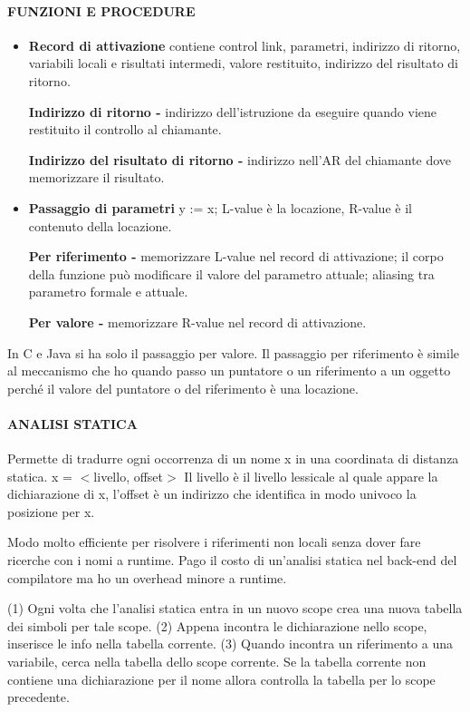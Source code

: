 \documentclass[a4paper, 12pt]{article}
\begin{document}
\paragraph{FUNZIONI E PROCEDURE}
\begin{itemize}
    \item \textbf{Record di attivazione} contiene control link, parametri, indirizzo di
    ritorno, variabili locali e risultati intermedi, valore restituito, indirizzo del
    risultato di ritorno.
    
    \textbf{Indirizzo di ritorno -} indirizzo dell'istruzione da eseguire quando viene
    restituito il controllo al chiamante.
    
    \textbf{Indirizzo del risultato di ritorno -} indirizzo nell'AR del chiamante dove
    memorizzare il risultato.
    
    \item \textbf{Passaggio di parametri}
    y := x; L-value è la locazione, R-value è il contenuto della locazione.

    \textbf{Per riferimento -} memorizzare L-value nel record di attivazione; il corpo della
    funzione può modificare il valore del parametro attuale; aliasing tra parametro formale
    e attuale. 
    
    \textbf{Per valore -} memorizzare R-value nel record di attivazione.
\end{itemize}
In C e Java si ha solo il passaggio per valore. Il passaggio per riferimento è simile al
meccanismo che ho quando passo un puntatore o un riferimento a un oggetto perché il valore
del puntatore o del riferimento è una locazione. 

\paragraph{ANALISI STATICA}
Permette di tradurre ogni occorrenza di un nome x in una coordinata di distanza statica.
x = $<$livello, offset$>$ Il livello è il livello lessicale al quale appare la dichiarazione
di x, l'offset è un indirizzo che identifica in modo univoco la posizione per x.

Modo molto efficiente per risolvere i riferimenti non locali senza dover fare ricerche con
i nomi a runtime.  Pago il costo di un'analisi statica nel back-end del compilatore ma ho un
overhead minore a runtime.

(1) Ogni volta che l'analisi statica entra in un nuovo scope crea una nuova tabella dei
simboli per tale scope. (2) Appena incontra le dichiarazione nello scope, inserisce le info
nella tabella corrente. (3) Quando incontra un riferimento a una variabile, cerca nella
tabella dello scope corrente. Se la tabella corrente non contiene una dichiarazione per il
nome allora controlla la tabella per lo scope precedente.
\end{document}
